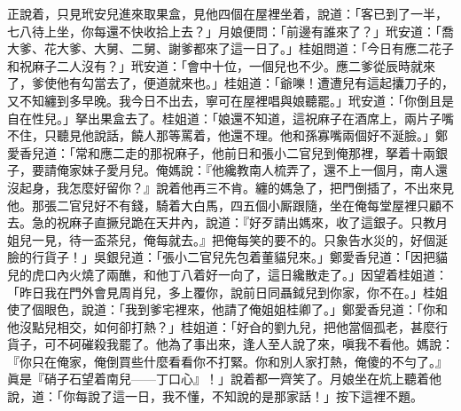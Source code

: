 正說着，只見玳安兒進來取果盒，見他四個在屋裡坐着，說道：「客已到了一半，七八待上坐，你每還不快收拾上去？」月娘便問：「前邊有誰來了？」玳安道：「喬大爹、花大爹、大舅、二舅、謝爹都來了這一日了。」桂姐問道：「今日有應二花子和祝麻子二人沒有？」玳安道：「會中十位，一個兒也不少。應二爹從辰時就來了，爹使他有勾當去了，便道就來也。」桂姐道：「爺嚛！遭遭兒有這起攮刀子的，又不知纏到多早晚。我今日不出去，寧可在屋裡唱與娘聽罷。」{}玳安道：「你倒且是自在性兒。」拏出果盒去了。桂姐道：「娘還不知道，這祝麻子在酒席上，兩片子嘴不住，只聽見他說話，饒人那等罵着，他還不理。他和孫寡嘴兩個好不涎臉。」{}鄭愛香兒道：「常和應二走的那祝麻子，他前日和張小二官兒到俺那裡，拏着十兩銀子，要請俺家妹子愛月兒。{}俺媽說：『他纔教南人梳弄了，還不上一個月，南人還沒起身，我怎麼好留你？』說着他再三不肯。纏的媽急了，把門倒插了，不出來見他。那張二官兒好不有錢，騎着大白馬，四五個小厮跟隨，坐在俺每堂屋裡只顧不去。{}急的祝麻子直撅兒跪在天井內，說道：『好歹請出媽來，收了這銀子。只教月姐兒一見，待一盃茶兒，俺每就去。』把俺每笑的要不的。只象告水災的，好個涎臉的行貨子！」吳銀兒道：「張小二官兒先包着董貓兒來。」鄭愛香兒道：「因把貓兒的虎口內火燒了兩醮，和他丁八着好一向了，這日纔散走了。」因望着桂姐道：「昨日我在門外會見周肖兒，多上覆你，說前日同聶鉞兒到你家，你不在。」桂姐使了個眼色，說道：「我到爹宅裡來，他請了俺姐姐桂卿了。」鄭愛香兒道：「你和他沒點兒相交，如何卻打熱？」桂姐道：「好㒲的劉九兒，{}把他當個孤老，甚麼行貨子，可不砢磪殺我罷了。他為了事出來，逢人至人說了來，嗔我不看他。媽說：『你只在俺家，俺倒買些什麼看看你不打緊。你和別人家打熱，俺傻的不勻了。』眞是『硝子石望着南兒——丁口心』！」說着都一齊笑了。月娘坐在炕上聽着他說，道：「你每說了這一日，我不懂，不知說的是那家話！」按下這裡不題。

